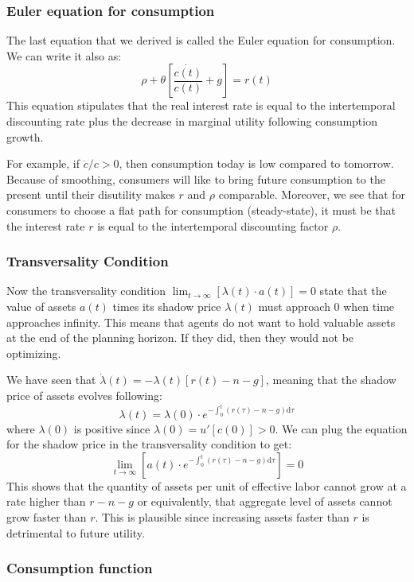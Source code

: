 \documentclass[12pt]{report}
\def\D{\mathrm{d}}
\begin{document}
\subsubsection{Euler equation for consumption}

The last equation that we derived is called the Euler equation for consumption. We can write it also as: $$ \rho + \theta\left[ \frac{\dot{c(t)}}{c(t)} + g\right] = r(t) $$ This equation stipulates that the real interest rate is equal to the intertemporal discounting rate plus the decrease in marginal utility following consumption growth.

For example, if $\dot c/c > 0$, then consumption today is low compared to tomorrow. Because of smoothing, consumers will like to bring future consumption to the present until their disutility makes $r$ and $\rho$ comparable. Moreover, we see that for consumers to choose a flat path for consumption (steady-state), it must be that the interest rate $r$ is equal to the intertemporal discounting factor $\rho$.

\subsubsection{Transversality Condition}

Now the transversality condition $\lim_{t\to\infty}[\lambda(t)\cdot a(t)] = 0$ state that the value of assets $a(t)$ times its shadow price $\lambda(t)$ must approach 0 when time approaches infinity. This means that agents do not want to hold valuable assets at the end of the planning horizon. If they did, then they would not be optimizing.

We have seen that $\dot{\lambda}(t) = -\lambda(t)[r(t) - n - g]$, meaning that the shadow price of assets evolves following: $$\lambda(t) = \lambda(0)\cdot e^{-\int_{0}^{t}(r(\tau) - n - g)\D\tau} $$ where $\lambda(0)$ is positive since $\lambda(0) = u'[c(0)] > 0$. We can plug the equation for the shadow price in the transversality condition to get: $$\lim_{t\to\infty}[a(t)\cdot e^{-\int_{0}^{t}(r(\tau) - n -g)\D\tau}] = 0 $$ This shows that the quantity of assets per unit of effective labor cannot grow at a rate higher than $r - n - g$ or equivalently, that aggregate level of assets cannot grow faster than $r$. This is plausible since increasing assets faster than $r$ is detrimental to future utility.

\subsubsection{Consumption function}
\end{document}
